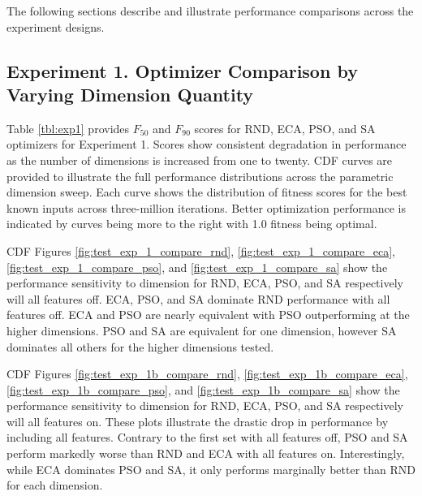 \documentclass[a4paper]{article}
\begin{document}
The following sections describe and illustrate performance comparisons across the experiment designs.

\subsection{Experiment 1. Optimizer Comparison by Varying Dimension Quantity }
\label{sec:results-1}

Table \ref{tbl:exp1} provides $F_{50}$ and $F_{90}$ scores for RND, ECA, PSO, and SA optimizers for Experiment 1. Scores show consistent degradation in performance as the number of dimensions is increased from one to twenty. CDF curves are provided to illustrate the full performance distributions across the parametric dimension sweep. Each curve shows the distribution of fitness scores for the best known inputs across three-million iterations. Better optimization performance is indicated by curves being more to the right with 1.0 fitness being optimal.

CDF Figures \ref{fig:test_exp_1_compare_rnd}, \ref{fig:test_exp_1_compare_eca}, \ref{fig:test_exp_1_compare_pso}, and \ref{fig:test_exp_1_compare_sa} show the performance sensitivity to dimension for RND, ECA, PSO, and SA respectively will all features off. ECA, PSO, and SA dominate RND performance with all features off. ECA and PSO are nearly equivalent with PSO outperforming at the higher dimensions. PSO and SA are equivalent for one dimension, however SA dominates all others for the higher dimensions tested.

CDF Figures \ref{fig:test_exp_1b_compare_rnd}, \ref{fig:test_exp_1b_compare_eca}, \ref{fig:test_exp_1b_compare_pso}, and \ref{fig:test_exp_1b_compare_sa} show the performance sensitivity to dimension for RND, ECA, PSO, and SA respectively will all features on. These plots illustrate the drastic drop in performance by including all features. Contrary to the first set with all features off, PSO and SA perform markedly worse than RND and ECA with all features on. Interestingly, while ECA dominates PSO and SA, it only performs marginally better than RND for each dimension.


\end{document}
